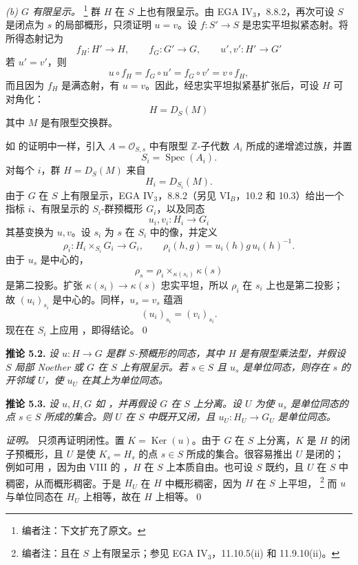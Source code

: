 \smallskip
{}\noindent\textit{(b) \(G\) 有限呈示。}%
\footnote{编者注：下文扩充了原文。}
群 \(H\) 在 \(S\) 上也有限呈示。由 EGA IV\(_3\)，8.8.2，再次可设 \(S\) 是闭点为 \(s\) 的局部概形，只须证明 \(u=v\)。设 \(f:S'\to S\) 是忠实平坦拟紧态射。将所得态射记为
\[
  f_H:H'\to H,
  \qquad
  f_G:G'\to G,
  \qquad
  u',v':H'\to G'
\]
若 \(u'=v'\)，则
\[
  u\circ f_H=f_G\circ u'=f_G\circ v'=v\circ f_H,
\]
而且因为 \(f_H\) 是满态射，有 \(u=v\)。因此，经忠实平坦拟紧基扩张后，可设 \(H\) 可对角化：
\[
  H=D_S(M)
\]
其中 \(M\) 是有限型交换群。

如  的证明中一样，引入 \(A=\mathscr O_{S,s}\) 中有限型 \(\mathbb Z\)-子代数 \(A_i\) 所成的递增滤过族，并置
\[
  S_i=\operatorname{Spec}(A_i).
\]
\footnotemark[30]
对每个 \(i\)，群 \(H=D_S(M)\) 来自
\[
  H_i=D_{S_i}(M).
\]
由于 \(G\) 在 \(S\) 上有限呈示，EGA IV\(_3\)，8.8.2（另见 VI\(_B\)，10.2 和 10.3）给出一个指标 \(i\)、有限呈示的 \(S_i\)-群预概形 \(G_i\)，以及同态
\[
  u_i,v_i:H_i\longrightarrow G_i
\]
其基变换为 \(u,v\)。设 \(s_i\) 为 \(s\) 在 \(S_i\) 中的像，并定义
\[
  \rho_i:H_i\times_{S_i}G_i\longrightarrow G_i,
  \qquad
  \rho_i(h,g)=u_i(h)g\,u_i(h)^{-1}.
\]
由于 \(u_s\) 是中心的，
\[
  \rho_s=\rho_i\times_{\kappa(s_i)}\kappa(s)
\]
是第二投影。扩张 \(\kappa(s_i)\to\kappa(s)\) 忠实平坦，所以 \(\rho_i\) 在 \(s_i\) 上也是第二投影；故 \((u_i)_{s_i}\) 是中心的。同样，\(u_s=v_s\) 蕴涵
\[
  (u_i)_{s_i}=(v_i)_{s_i}.
\]
现在在 \(S_i\) 上应用 ，即得结论。\qed

\medskip
\noindent{}\textbf{推论 5.2.}
\textit{设 \(u:H\to G\) 是群 \(S\)-预概形的同态，其中 \(H\) 是有限型乘法型，并假设 \(S\) 局部 Noether 或 \(G\) 在 \(S\) 上有限呈示。若 \(s\in S\) 且 \(u_s\) 是单位同态，则存在 \(s\) 的开邻域 \(U\)，使 \(u_U\) 在其上为单位同态。}

\medskip
\noindent{}\textbf{推论 5.3.}
\textit{设 \(u,H,G\) 如 ，并再假设 \(G\) 在 \(S\) 上分离。设 \(U\) 为使 \(u_s\) 是单位同态的点 \(s\in S\) 所成的集合。则 \(U\) 在 \(S\) 中既开又闭，且 \(u_U:H_U\to G_U\) 是单位同态。}

\emph{证明。}
只须再证明闭性。置 \(K=\operatorname{Ker}(u)\)。由于 \(G\) 在 \(S\) 上分离，\(K\) 是 \(H\) 的闭子预概形，且 \(U\) 是使 \(K_s=H_s\) 的点 \(s\in S\) 所成的集合。很容易推出 \(U\) 是闭的；例如可用 ，因为由 VIII 的 ，\(H\) 在 \(S\) 上本质自由。也可设 \(S\) 既约，且 \(U\) 在 \(S\) 中稠密，从而概形稠密。于是 \(H_U\) 在 \(H\) 中概形稠密，因为 \(H\) 在 \(S\) 上平坦，%
\footnote{编者注：且在 \(S\) 上有限呈示；参见 EGA IV\(_3\)，11.10.5(ii) 和 11.9.10(ii)。}
而 \(u\) 与单位同态在 \(H_U\) 上相等，故在 \(H\) 上相等。\qed

